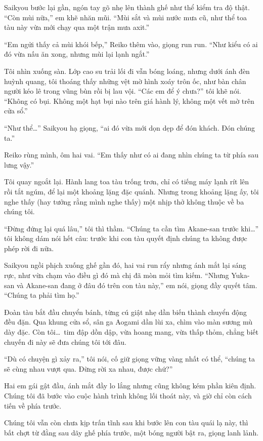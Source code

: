 \documentclass[../main.tex]{subfiles}
\begin{document}
Saikyou bước lại gần, ngón tay gõ nhẹ lên thành ghế như thể kiểm tra độ thật. ``Còn mùi nữa,'' em khẽ nhăn mũi. ``Mùi sắt và mùi nước mưa cũ, như thể toa tàu này vừa mới chạy qua một trận mưa axit.''

``Em ngửi thấy cả mùi khói bếp,'' Reiko thêm vào, giọng run run. ``Như kiểu có ai đó vừa nấu ăn xong, nhưng mùi lại lạnh ngắt.''

Tôi nhìn xuống sàn. Lớp cao su trải lối đi vẫn bóng loáng, nhưng dưới ánh đèn huỳnh quang, tôi thoáng thấy những vệt mờ hình xoáy trôn ốc, như bàn chân người kéo lê trong vũng bùn rồi bị lau vội. ``Các em để ý chưa?'' tôi khẽ nói. ``Không có bụi. Không một hạt bụi nào trên giá hành lý, không một vết mờ trên cửa sổ.''

``Như thể\dots'' Saikyou hạ giọng, ``ai đó vừa mới dọn dẹp để đón khách. Đón chúng ta.''

Reiko rùng mình, ôm hai vai. ``Em thấy như có ai đang nhìn chúng ta từ phía sau lưng vậy.''

Tôi quay ngoắt lại. Hành lang toa tàu trống trơn, chỉ có tiếng máy lạnh rít lên rồi tắt ngúm, để lại một khoảng lặng đặc quánh. Nhưng trong khoảng lặng ấy, tôi nghe thấy (hay tưởng rằng mình nghe thấy) một nhịp thở không thuộc về ba chúng tôi.

``Đừng đứng lại quá lâu,'' tôi thì thầm. ``Chúng ta cần tìm Akane-san trước khi\dots'' tôi không dám nói hết câu: trước khi con tàu quyết định chúng ta không được phép rời đi nữa.

Saikyou ngồi phịch xuống ghế gần đó, hai vai run rẩy nhưng ánh mắt lại sáng rực, như vừa chạm vào điều gì đó mà chị đã mòn mỏi tìm kiếm. ``Nhưng Yuka-san và Akane-san đang ở đâu đó trên con tàu này,'' em nói, giọng đầy quyết tâm. ``Chúng ta phải tìm họ.''

Đoàn tàu bắt đầu chuyển bánh, từng cú giật nhẹ dần biến thành chuyển động đều đặn. Qua khung cửa sổ, sân ga Aogami dần lùi xa, chìm vào màn sương mù dày đặc. Còn tôi\dots\ tim đập dồn dập, vừa hoang mang, vừa thấp thỏm, chẳng biết chuyến đi này sẽ đưa chúng tôi tới đâu.

``Dù có chuyện gì xảy ra,'' tôi nói, cố giữ giọng vững vàng nhất có thể, ``chúng ta sẽ cùng nhau vượt qua. Đừng rời xa nhau, được chứ?''

Hai em gái gật đầu, ánh mắt đầy lo lắng nhưng cũng không kém phần kiên định. Chúng tôi đã bước vào cuộc hành trình không lối thoát này, và giờ chỉ còn cách tiến về phía trước.

Chúng tôi vẫn còn chưa kịp trấn tĩnh sau khi bước lên con tàu quái lạ này, thì bất chợt từ đằng sau dãy ghế phía trước, một bóng người bật ra, giọng lanh lảnh.
\end{document}
